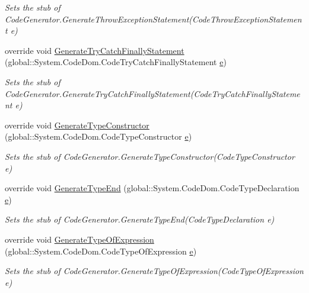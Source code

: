 \begin{DoxyCompactItemize}
\begin{DoxyCompactList}\small\item\em Sets the stub of Code\-Generator.\-Generate\-Throw\-Exception\-Statement(\-Code\-Throw\-Exception\-Statement e)\end{DoxyCompactList}\item 
override void \hyperlink{class_system_1_1_code_dom_1_1_compiler_1_1_fakes_1_1_stub_code_generator_a25a5bf3aef1c99157fda94ba763d31b4}{Generate\-Try\-Catch\-Finally\-Statement} (global\-::\-System.\-Code\-Dom.\-Code\-Try\-Catch\-Finally\-Statement \hyperlink{jquery-1_810_82_8min_8js_a2c038346d47955cbe2cb91e338edd7e1}{e})
\begin{DoxyCompactList}\small\item\em Sets the stub of Code\-Generator.\-Generate\-Try\-Catch\-Finally\-Statement(\-Code\-Try\-Catch\-Finally\-Statement e)\end{DoxyCompactList}\item 
override void \hyperlink{class_system_1_1_code_dom_1_1_compiler_1_1_fakes_1_1_stub_code_generator_a1af85ca4b49050a276ac6b6b075d1546}{Generate\-Type\-Constructor} (global\-::\-System.\-Code\-Dom.\-Code\-Type\-Constructor \hyperlink{jquery-1_810_82_8min_8js_a2c038346d47955cbe2cb91e338edd7e1}{e})
\begin{DoxyCompactList}\small\item\em Sets the stub of Code\-Generator.\-Generate\-Type\-Constructor(\-Code\-Type\-Constructor e)\end{DoxyCompactList}\item 
override void \hyperlink{class_system_1_1_code_dom_1_1_compiler_1_1_fakes_1_1_stub_code_generator_a2670b9a069759b17378b3b36ae8db4ec}{Generate\-Type\-End} (global\-::\-System.\-Code\-Dom.\-Code\-Type\-Declaration \hyperlink{jquery-1_810_82_8min_8js_a2c038346d47955cbe2cb91e338edd7e1}{e})
\begin{DoxyCompactList}\small\item\em Sets the stub of Code\-Generator.\-Generate\-Type\-End(\-Code\-Type\-Declaration e)\end{DoxyCompactList}\item 
override void \hyperlink{class_system_1_1_code_dom_1_1_compiler_1_1_fakes_1_1_stub_code_generator_a6b0db2ba7b02d196dff1a3cdbcda46e3}{Generate\-Type\-Of\-Expression} (global\-::\-System.\-Code\-Dom.\-Code\-Type\-Of\-Expression \hyperlink{jquery-1_810_82_8min_8js_a2c038346d47955cbe2cb91e338edd7e1}{e})
\begin{DoxyCompactList}\small\item\em Sets the stub of Code\-Generator.\-Generate\-Type\-Of\-Expression(\-Code\-Type\-Of\-Expression e)\end{DoxyCompactList}\item 

\end{DoxyCompactItemize}

